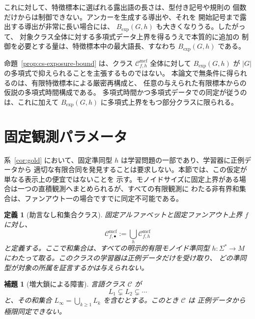 \documentclass[11pt,a4paper]{ltjsarticle}
\newtheorem{lemma}[theorem]{補題}
\newtheorem{definition}[theorem]{定義}
\theoremstyle{remark}
\newcommand{\Cmcf}[2]{\mathcal{C}^{\mathrm{mcf}}_{#1,#2}}
\begin{document}
これに対して、特徴標本に選ばれる露出語の長さは、型付き記号や規則の
個数だけからは制御できない。アンカーを生成する導出や、それを
開始記号まで露出する導出が非常に長い場合には、
\(B_{\mathrm{exp}}(G,h)\) も大きくなりうる。したがって、
対象クラス全体に対する多項式データ上界を得るうえで本質的に追加の
制御を必要とする量は、特徴標本中の最大語長、すなわち
\(B_{\mathrm{exp}}(G,h)\) である。

命題~\ref{prop:cs-exposure-bound} は、クラス
\(\Cmcf{f}{h}\) 全体に対して \(B_{\mathrm{exp}}(G,h)\) が
\(\lvert G\rvert\) の多項式で抑えられることを主張するものではない。
本論文で無条件に得られるのは、有限特徴標本による厳密再構成と、
任意の与えられた有限標本からの仮説の多項式時間構成である。
多項式時間かつ多項式データでの同定が従うのは、これに加えて
\(B_{\mathrm{exp}}(G,h)\) に多項式上界をもつ部分クラスに限られる。



\section{固定観測パラメータ}
\label{sec:fixed-observation}

系~\ref{cor:gold} において、固定準同型 \(h\) は学習問題の一部であり、学習器に正例データから
適切な有限合同を発見することは要求しない。本節では、この仮定が単なる表示上の便宜ではないことを
示す。モノイドサイズに固定上界がある場合は一つの直積観測へまとめられるが、すべての有限観測に
わたる非有界和集合は、ファンアウト一の場合ですでに同定不可能である。

\begin{definition}[助言なし和集合クラス]
\label{def:no-advice-union}
固定アルファベットと固定ファンアウト上界 \(f\) に対し、
\[
  \Cmcf{f}{\bullet}:=\bigcup_h \Cmcf{f}{h}
\]
と定義する。ここで和集合は、すべての明示的有限モノイド準同型
\(h\colon\Sigma^*\to M\) にわたって取る。このクラスの学習器は正例データだけを受け取り、
どの準同型が対象の所属を証言するかは与えられない。
\end{definition}

\begin{lemma}[増大鎖による障害]
\label{lem:ascending-chain-obstruction}
言語クラス \(\mathcal C\) が
\[
  L_1\subsetneq L_2\subsetneq\cdots
\]
と、その和集合 \(L_\infty=\bigcup_{k\ge1}L_k\) を含むとする。このとき \(\mathcal C\) は
正例データから極限同定できない。
\end{lemma}
\end{document}
